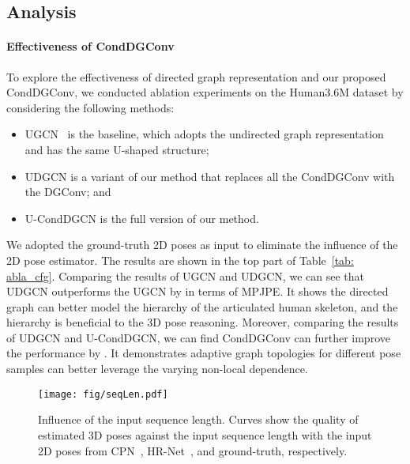 \documentclass[sigconf]{acmart}
\begin{document}
\vspace{-1mm}
\subsection{Analysis}

\paragraph{Effectiveness of CondDGConv}

To explore the effectiveness of directed graph representation and our proposed CondDGConv, we conducted ablation experiments on the Human3.6M dataset by considering the following methods:
\vspace{-1mm}
\begin{itemize}
	\item UGCN~\cite{wang2020motion} is the baseline, which adopts the undirected graph representation and has the same U-shaped structure;
	\item UDGCN is a variant of our method that replaces all the CondDGConv with the DGConv; and
	\item U-CondDGCN is the full version of our method.
	\vspace{-1mm}
\end{itemize}
We adopted the ground-truth 2D poses as input to eliminate the influence of the 2D pose estimator.
The results are shown in the top part of Table~\ref{tab: abla_cfg}.
Comparing the results of UGCN and UDGCN, we can see that UDGCN outperforms the UGCN by  in terms of MPJPE.
It shows the directed graph can better model the hierarchy of the articulated human skeleton, and the hierarchy is beneficial to the 3D pose reasoning.
Moreover, comparing the results of UDGCN and U-CondDGCN, we can find CondDGConv can further improve the performance by .
It demonstrates adaptive graph topologies for different pose samples can better leverage the varying non-local dependence.



\begin{figure}[!t] 
	\centering
	\texttt{[image: fig/seqLen.pdf]}
	\vspace{-3mm}
	\caption{
		Influence of the input sequence length. Curves show the quality of estimated 3D poses against the input sequence length with the input 2D poses from CPN~\cite{chen2018cascaded}, HR-Net~\cite{sun2019deep}, and ground-truth, respectively.
	}
	\vspace{-4mm}
	\label{fig: seqLen}
\end{figure} 
\end{document}
